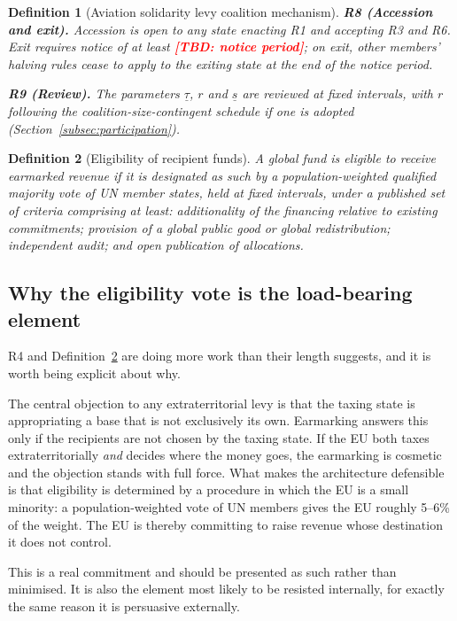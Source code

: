 \documentclass[11pt]{article}
\newtheorem{definition}{Definition}
\newcommand{\tbd}[1]{\textcolor{red}{\textbf{[TBD: #1]}}}
\begin{document}
\begin{definition}[Aviation solidarity levy coalition mechanism]
\medskip
\noindent\textbf{R8 (Accession and exit).} Accession is open to any state
enacting R1 and accepting R3 and R6. Exit requires notice of at least
\tbd{notice period}; on exit, other members' halving rules cease to apply to the
exiting state at the end of the notice period.

\medskip
\noindent\textbf{R9 (Review).} The parameters $\underline\tau$, $r$ and
$\underline{s}$ are reviewed at fixed intervals, with $r$ following the
coalition-size-contingent schedule if one is adopted
(Section~\ref{subsec:participation}).
\end{definition}

\begin{definition}[Eligibility of recipient funds]
\label{def:eligibility}
A global fund is eligible to receive earmarked revenue if it is designated as
such by a population-weighted qualified majority vote of UN member states, held
at fixed intervals, under a published set of criteria comprising at least:
additionality of the financing relative to existing commitments; provision of a
global public good or global redistribution; independent audit; and open
publication of allocations.
\end{definition}

\subsection{Why the eligibility vote is the load-bearing element}

R4 and Definition~\ref{def:eligibility} are doing more work than their length
suggests, and it is worth being explicit about why.

The central objection to any extraterritorial levy is that the taxing state is
appropriating a base that is not exclusively its own. Earmarking answers this
only if the recipients are not chosen by the taxing state. If the EU both taxes
extraterritorially \emph{and} decides where the money goes, the earmarking is
cosmetic and the objection stands with full force. What makes the architecture
defensible is that eligibility is determined by a procedure in which the EU is a
small minority: a population-weighted vote of UN members gives the EU roughly
5--6\% of the weight. The EU is thereby committing to raise revenue whose
destination it does not control.

This is a real commitment and should be presented as such rather than
minimised. It is also the element most likely to be resisted internally, for
exactly the same reason it is persuasive externally.
\end{document}

